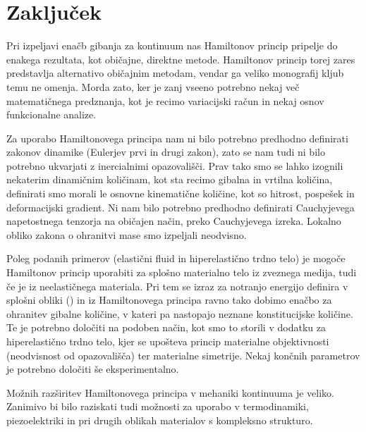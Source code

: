 \chapter*{Zaključek}


Pri izpeljavi enačb gibanja za kontinuum nas Hamiltonov princip pripelje do enakega rezultata,
kot običajne, direktne metode. Hamiltonov princip torej zares predstavlja alternativo običajnim
metodam, vendar ga veliko monografij kljub temu ne omenja. Morda zato, ker je zanj
vseeno potrebno nekaj več matematičnega predznanja, kot je recimo variacijski račun
in nekaj osnov funkcionalne analize.

Za uporabo Hamiltonovega principa nam ni bilo potrebno predhodno definirati
zakonov dinamike (Eulerjev prvi in drugi zakon), zato se nam tudi ni bilo
potrebno ukvarjati z inercialnimi opazovališči. Prav tako smo se lahko
izognili nekaterim dinamičnim količinam, kot sta recimo gibalna in vrtilna količina,
definirati smo morali le osnovne
kinematične količine, kot so hitrost, pospešek in deformacijski gradient.
Ni nam bilo potrebno predhodno definirati Cauchyjevega napetostnega tenzorja
na običajen način, preko Cauchyjevega izreka.
Lokalno obliko zakona o ohranitvi mase smo izpeljali neodvisno.

Poleg podanih primerov (elastični fluid in hiperelastično trdno telo) je
mogoče Hamiltonov princip uporabiti za splošno materialno telo iz
zveznega medija, tudi če je iz neelastičnega materiala. Pri tem se
izraz za notranjo energijo definira v splošni obliki (\cite[str.~45]{bedford}) in iz Hamiltonovega
principa ravno tako dobimo enačbo za ohranitev gibalne količine, v
kateri pa nastopajo neznane konstitucijske količine. Te je potrebno določiti
na podoben način, kot smo to storili v dodatku za hiperelastično trdno telo,
kjer se upošteva princip materialne objektivnosti (neodvisnost od opazovališča)
ter materialne simetrije. Nekaj končnih parametrov je potrebno določiti
še eksperimentalno.

Možnih razširitev Hamiltonovega principa v mehaniki kontinuuma je veliko.
Zanimivo bi bilo raziskati tudi možnosti za uporabo v termodinamiki, piezoelektriki
in pri drugih oblikah materialov s kompleksno strukturo.
